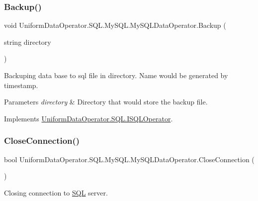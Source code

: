 \subsubsection{\texorpdfstring{Backup()}{Backup()}}
{\footnotesize\ttfamily void Uniform\+Data\+Operator.\+S\+Q\+L.\+My\+S\+Q\+L.\+My\+S\+Q\+L\+Data\+Operator.\+Backup (\begin{DoxyParamCaption}\item[{string}]{directory }\end{DoxyParamCaption})}



Backuping data base to sql file in directory. Name would be generated by timestamp. 


\begin{DoxyParams}{Parameters}
{\em directory} & Directory that would store the backup file.\\
\hline
\end{DoxyParams}


Implements \mbox{\hyperlink{interface_uniform_data_operator_1_1_s_q_l_1_1_i_s_q_l_operator_acc29fb7a4b5c3d2dc91d5f9f32b91ca5}{Uniform\+Data\+Operator.\+S\+Q\+L.\+I\+S\+Q\+L\+Operator}}.

\mbox{\label{class_uniform_data_operator_1_1_s_q_l_1_1_my_s_q_l_1_1_my_s_q_l_data_operator_a91ede325ae734daa6a6fff90cab920bc}} 
\subsubsection{\texorpdfstring{Close\+Connection()}{CloseConnection()}}
{\footnotesize\ttfamily bool Uniform\+Data\+Operator.\+S\+Q\+L.\+My\+S\+Q\+L.\+My\+S\+Q\+L\+Data\+Operator.\+Close\+Connection (\begin{DoxyParamCaption}{ }\end{DoxyParamCaption})}



Closing connection to \mbox{\hyperlink{namespace_uniform_data_operator_1_1_s_q_l}{S\+QL}} server. 

